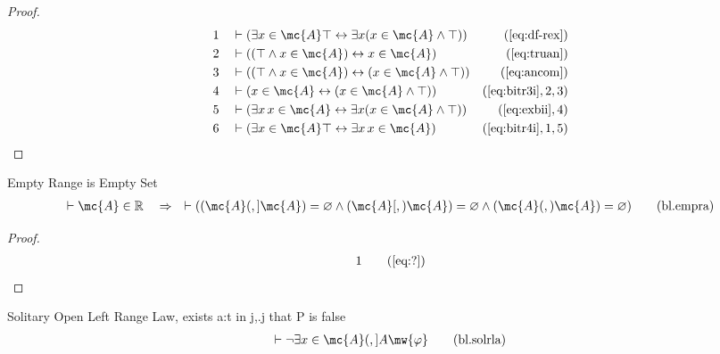 \begin{proof}
\begin{align}
  1 &&  & \vdash ( \exists x \in \mc{A} \top \leftrightarrow \exists x ( x \in \mc{A}
    \wedge \top ) )&(\mbox{\ref{eq:df-rex}})\notag
  \\ 2 &&  & \vdash ( ( \top \wedge x \in \mc{A} ) \leftrightarrow x \in \mc{A} 
    )&(\mbox{\ref{eq:truan}})\notag
  \\ 3 &&  & \vdash ( ( \top \wedge x \in \mc{A} ) \leftrightarrow ( x \in \mc{A} \wedge
    \top ) )&(\mbox{\ref{eq:ancom}})\notag
  \\ 4 &&  & \vdash ( x \in \mc{A} \leftrightarrow ( x \in \mc{A} \wedge \top )
    )&(\mbox{\ref{eq:bitr3i}},2,3)\notag
  \\ 5 &&  & \vdash ( \exists x \,x \in \mc{A} \leftrightarrow \exists x ( x \in \mc{A}
    \wedge \top ) )&(\mbox{\ref{eq:exbii}},4)\notag
  \\ 6 &&  & \vdash ( \exists x \in \mc{A} \top \leftrightarrow \exists x \,x \in \mc{A}
    )&(\mbox{\ref{eq:bitr4i}},1,5)\notag
\end{align}
\end{proof}

\begin{lemma} {Empty Range is Empty Set}
\begin{align}
\vdash \mc{A} \in \mathbb{R}\quad\Rightarrow\quad \vdash ( ( \mc{A} (,] \mc{A} ) = \varnothing
    \wedge ( \mc{A} [,) \mc{A} ) = \varnothing \wedge ( \mc{A} (,) \mc{A} ) = \varnothing
    )\label{eq:bl.empra}\tag{bl.empra}
\end{align}
\end{lemma}

\begin{proof}
\begin{align}
  1 &&  & &(\mbox{\ref{eq:?}})\notag
\end{align}
\end{proof}


\begin{lemma} {Solitary Open Left Range Law, exists} a:t
in j,.j that P is false
\begin{align}
\vdash \lnot \exists x \in \mc{A} (,] A
    \mw{\varphi}\label{eq:bl.solrla}\tag{bl.solrla}
\end{align}
\end{lemma}


